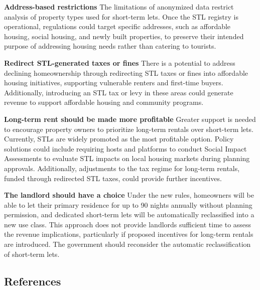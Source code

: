 \documentclass[
  a4paper,
  DIV=11,
  numbers=noendperiod]{scrartcl}
\begin{document}
\textbf{Address-based restrictions} The limitations of anonymized data
restrict analysis of property types used for short-term lets. Once the
STL registry is operational, regulations could target specific
addresses, such as affordable housing, social housing, and newly built
properties, to preserve their intended purpose of addressing housing
needs rather than catering to tourists.

\textbf{Redirect STL-generated taxes or fines} There is a potential to
address declining homeownership through redirecting STL taxes or fines
into affordable housing initiatives, supporting vulnerable renters and
first-time buyers. Additionally, introducing an STL tax or levy in these
areas could generate revenue to support affordable housing and community
programs.

\textbf{Long-term rent should be made more profitable} Greater support
is needed to encourage property owners to prioritize long-term rentals
over short-term lets. Currently, STLs are widely promoted as the most
profitable option. Policy solutions could include requiring hosts and
platforms to conduct Social Impact Assessments to evaluate STL impacts
on local housing markets during planning approvals. Additionally,
adjustments to the tax regime for long-term rentals, funded through
redirected STL taxes, could provide further incentives.

\textbf{The landlord should have a choice} Under the new rules,
homeowners will be able to let their primary residence for up to 90
nights annually without planning permission, and dedicated short-term
lets will be automatically reclassified into a new use class. This
approach does not provide landlords sufficient time to assess the
revenue implications, particularly if proposed incentives for long-term
rentals are introduced. The government should reconsider the automatic
reclassification of short-term lets.

\subsection*{References}\label{references}
\end{document}
